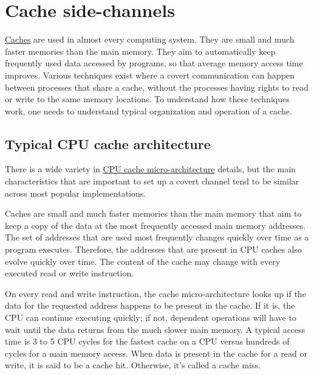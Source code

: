 \documentclass[a4paper,]{report}
\begin{document}
\hypertarget{cache-side-channels}{%
\section{Cache side-channels}\label{cache-side-channels}}

\href{https://en.wikipedia.org/wiki/Cache_(computing)}{Caches}
are used in almost every computing system. They are small and much
faster memories than the main memory. They aim to automatically keep
frequently used data accessed by programs, so that average memory access
time improves. Various techniques exist where a covert communication can
happen between processes that share a cache, without the processes
having rights to read or write to the same memory locations. To
understand how these techniques work, one needs to understand typical
organization and operation of a cache.

\hypertarget{typical-cpu-cache-architecture}{%
\subsection{Typical CPU cache
architecture}\label{typical-cpu-cache-architecture}}

There is a wide variety in
\href{https://en.wikipedia.org/wiki/CPU_cache}{CPU cache
micro-architecture} details, but the main characteristics that are
important to set up a covert channel tend to be similar across most
popular implementations.

Caches are small and much faster memories than the main memory that aim
to keep a copy of the data at the most frequently accessed main memory
addresses. The set of addresses that are used most frequently changes
quickly over time as a program executes. Therefore, the addresses that
are present in CPU caches also evolve quickly over time. The content of
the cache may change with every executed read or write instruction.

On every read and write instruction, the cache micro-architecture looks
up if the data for the requested address happens to be present in the
cache. If it is, the CPU can continue executing quickly; if not,
dependent operations will have to wait until the data returns from the
much slower main memory. A typical access time is 3 to 5 CPU cycles for
the fastest cache on a CPU versus hundreds of cycles for a main memory
access. When data is present in the cache for
a read or write, it is said to be a cache hit.
Otherwise, it's called a cache miss.
\end{document}
